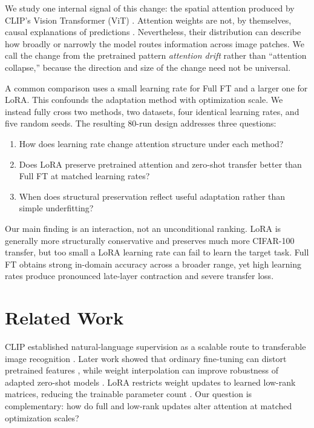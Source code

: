 \documentclass[conference]{IEEEtran}
\begin{document}
We study one internal signal of this change: the spatial attention produced by CLIP's Vision Transformer (ViT) \cite{dosovitskiy2021image}. Attention weights are not, by themselves, causal explanations of predictions \cite{jain2019attention,wiegreffe2019attention}. Nevertheless, their distribution can describe how broadly or narrowly the model routes information across image patches. We call the change from the pretrained pattern \emph{attention drift} rather than ``attention collapse,'' because the direction and size of the change need not be universal.

A common comparison uses a small learning rate for Full FT and a larger one for LoRA. This confounds the adaptation method with optimization scale. We instead fully cross two methods, two datasets, four identical learning rates, and five random seeds. The resulting 80-run design addresses three questions:

\begin{enumerate}
    \item How does learning rate change attention structure under each method?
    \item Does LoRA preserve pretrained attention and zero-shot transfer better than Full FT at matched learning rates?
    \item When does structural preservation reflect useful adaptation rather than simple underfitting?
\end{enumerate}

Our main finding is an interaction, not an unconditional ranking. LoRA is generally more structurally conservative and preserves much more CIFAR-100 transfer, but too small a LoRA learning rate can fail to learn the target task. Full FT obtains strong in-domain accuracy across a broader range, yet high learning rates produce pronounced late-layer contraction and severe transfer loss.

\section{Related Work}
CLIP established natural-language supervision as a scalable route to transferable image recognition \cite{radford2021learning}. Later work showed that ordinary fine-tuning can distort pretrained features \cite{kumar2022finetuning}, while weight interpolation can improve robustness of adapted zero-shot models \cite{wortsman2022robust}. LoRA restricts weight updates to learned low-rank matrices, reducing the trainable parameter count \cite{hu2022lora}. Our question is complementary: how do full and low-rank updates alter attention at matched optimization scales?
\end{document}
